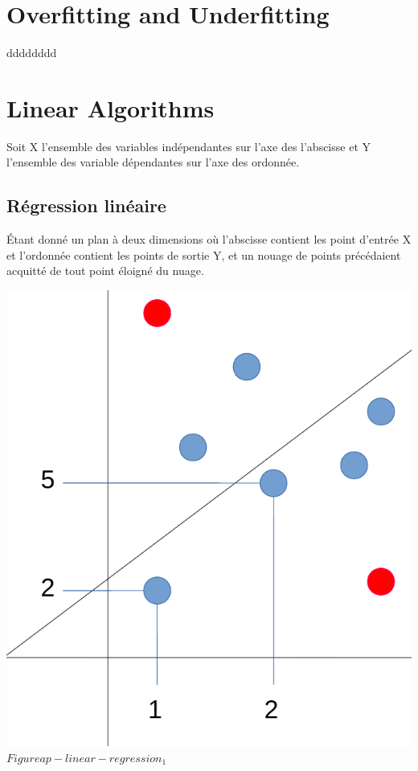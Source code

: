 \pagebreak
\section{Overfitting and Underfitting}
dddddddd

\pagebreak
\section{Linear Algorithms}

Soit X l'ensemble des variables indépendantes sur l'axe des l'abscisse et
Y l'ensemble des variable dépendantes sur l'axe des ordonnée.

\subsection{Régression linéaire}
Étant donné un plan à deux dimensions où l'abscisse contient les point d'entrée X et l'ordonnée contient les points de sortie Y, et un nouage de points précédaient acquitté de tout point éloigné du nuage.

\includegraphics[scale=0.3]{img/ap-linear-regression_1.png}
$Figure ap-linear-regression_1$

